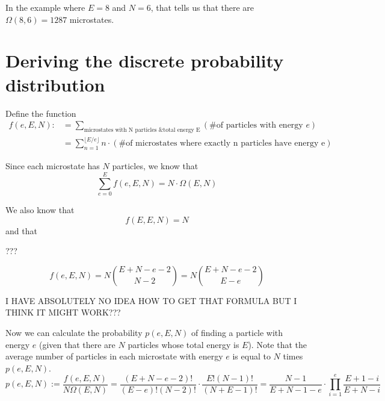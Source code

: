 \documentclass[12pt]{article}
\begin{document}
In the example where $E=8$ and $N=6$, that tells us that there are $\Omega(8, 6) = 1287$ microstates.

\section{Deriving the discrete probability distribution}

Define the function
\begin{align*}
    f(e, E, N) :&= \sum_{\text{microstates with N particles \& total energy E}} (\text{\# of particles with energy }e) \\
    &= \sum_{n=1}^{\lfloor E / e \rfloor} n \cdot (\text{\# of microstates where exactly n particles have energy e})
\end{align*}

Since each microstate has $N$ particles, we know that
\[\sum_{e=0}^E f(e, E, N) = N \cdot \Omega(E, N)\]

We also know that
\[f(E, E, N) = N\]
and that

???

\[f(e, E, N) = N {{E + N - e - 2} \choose {N - 2}} = N {{E + N - e - 2} \choose {E - e}}\]

I HAVE ABSOLUTELY NO IDEA HOW TO GET THAT FORMULA BUT I THINK IT MIGHT WORK???

Now we can calculate the probability $p(e, E, N)$ of finding a particle with energy $e$ (given that there are $N$ particles whose total energy is $E$). Note that the average number of particles in each microstate with energy $e$ is equal to $N$ times $p(e, E, N)$.
\[p(e, E, N) := \frac{f(e, E, N)}{N \Omega(E, N)} = \frac{(E+N-e-2)!}{(E-e)!(N-2)!} \cdot \frac{E!(N-1)!}{(N+E-1)!} = \frac{N-1}{E+N-1-e} \cdot \prod_{i=1}^e \frac{E+1-i}{E+N-i} \]
\end{document}
